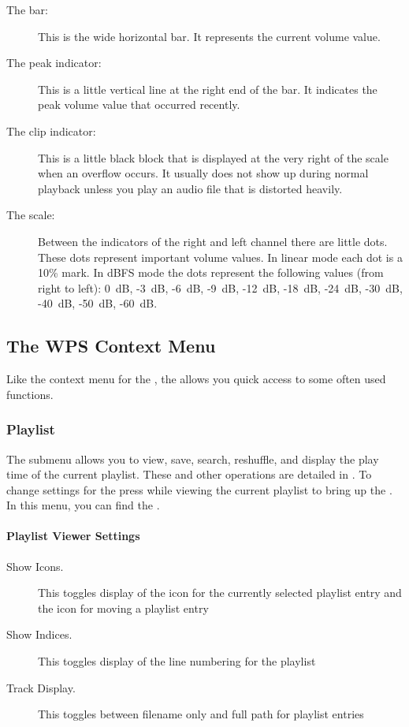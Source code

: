 \begin{description}
\item [The bar:]
  This is the wide horizontal bar. It represents the current volume value.
\item [The peak indicator:]
  This is a little vertical line at the right end of the bar. It indicates
  the peak volume value that occurred recently.
\item [The clip indicator:]
  This is a little black block that is displayed at the very right of the
  scale when an overflow occurs. It usually does not show up during normal
  playback unless you play an audio file that is distorted heavily.
\item [The scale:]
  Between the indicators of the right and left channel there are little dots.
  These dots represent important volume values. In linear mode each dot is a
  10\% mark. In dBFS mode the dots represent the following values (from right
  to left): 0~dB, {}-3~dB, {}-6~dB, {}-9~dB, {}-12~dB, {}-18~dB, {}-24~dB, {}-30~dB,
  {}-40~dB, {}-50~dB, {}-60~dB.
\end{description}

\subsection{\label{sec:contextmenu}The WPS Context Menu}
Like the context menu for the , the 
allows you quick access to some often used functions.

\subsubsection{Playlist}
The  submenu allows you to view, save, search, reshuffle,
and display the play time of the current playlist. These and other operations
are detailed in . To change settings for
the  press \ActionStdContext{} while viewing the
current playlist to bring up the . In this
menu, you can find the .

\paragraph{Playlist Viewer Settings}
  \begin{description}
    \item[Show Icons.] This toggles display of the icon for the currently
    selected playlist entry and the icon for moving a playlist entry
    \item[Show Indices.] This toggles display of the line numbering for
       the playlist
    \item[Track Display.] This toggles between filename only and full path
       for playlist entries
  \end{description}


